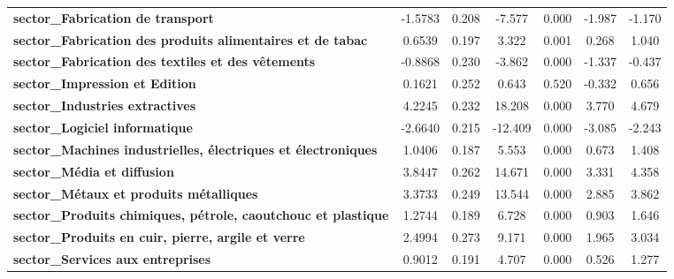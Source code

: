 \begin{center}
\begin{tabular}{lcccccc}
\textbf{sector\_Fabrication de transport}                             &      -1.5783  &        0.208     &    -7.577  &         0.000        &       -1.987    &       -1.170     \\
\textbf{sector\_Fabrication des produits alimentaires et de tabac}    &       0.6539  &        0.197     &     3.322  &         0.001        &        0.268    &        1.040     \\
\textbf{sector\_Fabrication des textiles et des vêtements}            &      -0.8868  &        0.230     &    -3.862  &         0.000        &       -1.337    &       -0.437     \\
\textbf{sector\_Impression et Edition}                                &       0.1621  &        0.252     &     0.643  &         0.520        &       -0.332    &        0.656     \\
\textbf{sector\_Industries extractives}                               &       4.2245  &        0.232     &    18.208  &         0.000        &        3.770    &        4.679     \\
\textbf{sector\_Logiciel informatique}                                &      -2.6640  &        0.215     &   -12.409  &         0.000        &       -3.085    &       -2.243     \\
\textbf{sector\_Machines industrielles, électriques et électroniques} &       1.0406  &        0.187     &     5.553  &         0.000        &        0.673    &        1.408     \\
\textbf{sector\_Média et diffusion}                                   &       3.8447  &        0.262     &    14.671  &         0.000        &        3.331    &        4.358     \\
\textbf{sector\_Métaux et produits métalliques}                       &       3.3733  &        0.249     &    13.544  &         0.000        &        2.885    &        3.862     \\
\textbf{sector\_Produits chimiques, pétrole, caoutchouc et plastique} &       1.2744  &        0.189     &     6.728  &         0.000        &        0.903    &        1.646     \\
\textbf{sector\_Produits en cuir, pierre, argile et verre}            &       2.4994  &        0.273     &     9.171  &         0.000        &        1.965    &        3.034     \\
\textbf{sector\_Services aux entreprises}                             &       0.9012  &        0.191     &     4.707  &         0.000        &        0.526    &        1.277     \\

\end{tabular}
\end{center}
